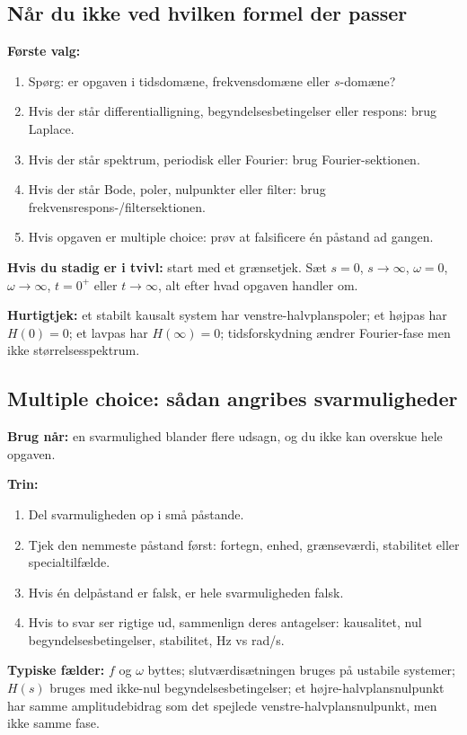 \subsection{Når du ikke ved hvilken formel der passer}

\textbf{Første valg:}
\begin{enumerate}
    \item Spørg: er opgaven i tidsdomæne, frekvensdomæne eller \(s\)-domæne?
    \item Hvis der står differentialligning, begyndelsesbetingelser eller respons: brug Laplace.
    \item Hvis der står spektrum, periodisk eller Fourier: brug Fourier-sektionen.
    \item Hvis der står Bode, poler, nulpunkter eller filter: brug frekvensrespons-/filtersektionen.
    \item Hvis opgaven er multiple choice: prøv at falsificere én påstand ad gangen.
\end{enumerate}

\textbf{Hvis du stadig er i tvivl:} start med et grænsetjek. Sæt \(s=0\), \(s\to\infty\), \(\omega=0\), \(\omega\to\infty\), \(t=0^+\) eller \(t\to\infty\), alt efter hvad opgaven handler om.

\textbf{Hurtigtjek:} et stabilt kausalt system har venstre-halvplanspoler; et højpas har \(H(0)=0\); et lavpas har \(H(\infty)=0\); tidsforskydning ændrer Fourier-fase men ikke størrelsesspektrum.

\subsection{Multiple choice: sådan angribes svarmuligheder}

\textbf{Brug når:} en svarmulighed blander flere udsagn, og du ikke kan overskue hele opgaven.

\textbf{Trin:}
\begin{enumerate}
    \item Del svarmuligheden op i små påstande.
    \item Tjek den nemmeste påstand først: fortegn, enhed, grænseværdi, stabilitet eller specialtilfælde.
    \item Hvis én delpåstand er falsk, er hele svarmuligheden falsk.
    \item Hvis to svar ser rigtige ud, sammenlign deres antagelser: kausalitet, nul begyndelsesbetingelser, stabilitet, Hz vs rad/s.
\end{enumerate}

\textbf{Typiske fælder:} \(f\) og \(\omega\) byttes; slutværdisætningen bruges på ustabile systemer; \(H(s)\) bruges med ikke-nul begyndelsesbetingelser; et højre-halvplansnulpunkt har samme amplitudebidrag som det spejlede venstre-halvplansnulpunkt, men ikke samme fase.
